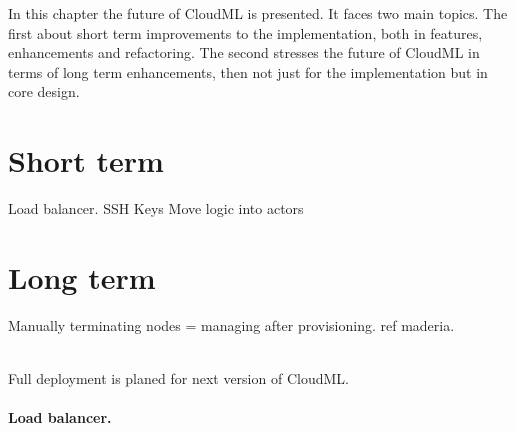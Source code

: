 
In this chapter the future of CloudML is presented.
It faces two main topics.
The first about short term improvements to the implementation, both in features, enhancements and refactoring.
The second stresses the future of CloudML in terms of long term enhancements,
then not just for the implementation but in core design.

\section{Short term}

Load balancer.
SSH Keys
Move logic into actors

\section{Long term}

Manually terminating nodes = managing after provisioning.
ref maderia.

\\

Full deployment is planed for next version of CloudML.


\paragraph{Load balancer.}


